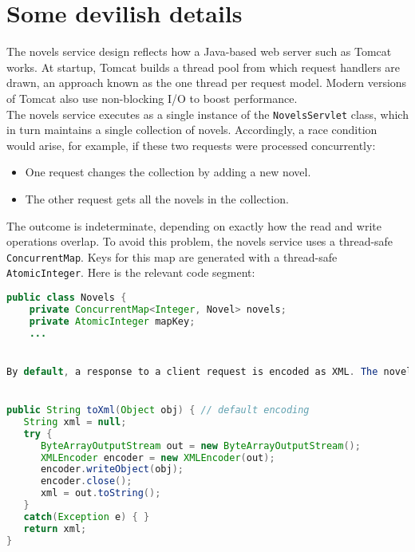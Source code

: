 \documentclass[12pt]{article}
\begin{document}
\section{Some devilish details}

The novels service design reflects how a Java-based web server such as Tomcat works. At startup, Tomcat builds a thread pool from which request handlers are drawn, an approach known as the one thread per request model. Modern versions of Tomcat also use non-blocking I/O to boost performance.\\

The novels service executes as a single instance of the \verb|NovelsServlet| class, which in turn maintains a single collection of novels. Accordingly, a race condition would arise, for example, if these two requests were processed concurrently:\\

\begin{itemize}
	\item One request changes the collection by adding a new novel.
	\item The other request gets all the novels in the collection.
\end{itemize}

The outcome is indeterminate, depending on exactly how the read and write operations overlap. To avoid this problem, the novels service uses a thread-safe \verb|ConcurrentMap|. Keys for this map are generated with a thread-safe \verb|AtomicInteger|. Here is the relevant code segment:\\

\begin{lstlisting}[language=java]
public class Novels {
    private ConcurrentMap<Integer, Novel> novels;
    private AtomicInteger mapKey;
    ...


By default, a response to a client request is encoded as XML. The novels program uses the old-time \verb|XMLEncoder| class for simplicity; a far richer option is the JAX-B library. The code is straightforward:


public String toXml(Object obj) { // default encoding
   String xml = null;
   try {
      ByteArrayOutputStream out = new ByteArrayOutputStream();
      XMLEncoder encoder = new XMLEncoder(out);
      encoder.writeObject(obj);
      encoder.close();
      xml = out.toString();
   }
   catch(Exception e) { }
   return xml;
}

\end{lstlisting}
\end{document}
